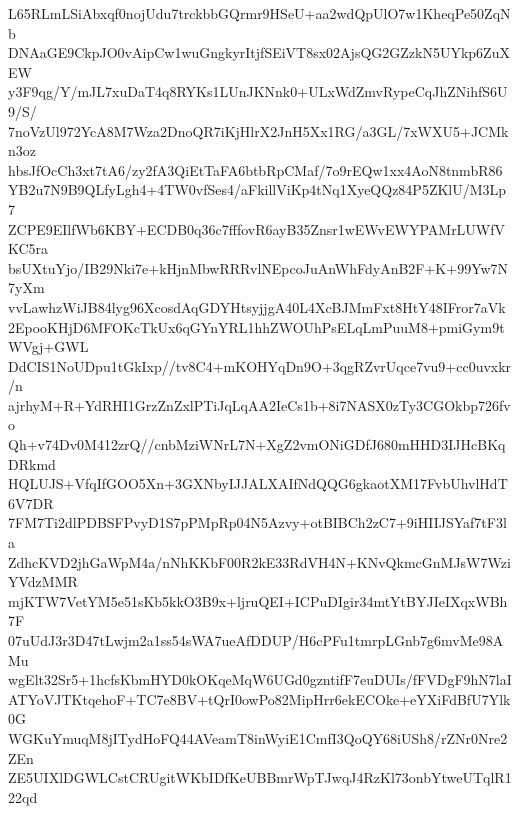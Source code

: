 L65RLmLSiAbxqf0nojUdu7trckbbGQrmr9HSeU+aa2wdQpUlO7w1KheqPe50ZqNb
DNAaGE9CkpJO0vAipCw1wuGngkyrItjfSEiVT8sx02AjsQG2GZzkN5UYkp6ZuXEW
y3F9qg/Y/mJL7xuDaT4q8RYKs1LUnJKNnk0+ULxWdZmvRypeCqJhZNihfS6U9/S/
7noVzUl972YcA8M7Wza2DnoQR7iKjHlrX2JnH5Xx1RG/a3GL/7xWXU5+JCMkn3oz
hbsJfOcCh3xt7tA6/zy2fA3QiEtTaFA6btbRpCMaf/7o9rEQw1xx4AoN8tnmbR86
YB2u7N9B9QLfyLgh4+4TW0vfSes4/aFkillViKp4tNq1XyeQQz84P5ZKlU/M3Lp7
ZCPE9EIlfWb6KBY+ECDB0q36c7fffovR6ayB35Znsr1wEWvEWYPAMrLUWfVKC5ra
bsUXtuYjo/IB29Nki7e+kHjnMbwRRRvlNEpcoJuAnWhFdyAnB2F+K+99Yw7N7yXm
vvLawhzWiJB84lyg96XcosdAqGDYHtsyjjgA40L4XcBJMmFxt8HtY48IFror7aVk
2EpooKHjD6MFOKcTkUx6qGYnYRL1hhZWOUhPsELqLmPuuM8+pmiGym9tWVgj+GWL
DdCIS1NoUDpu1tGkIxp//tv8C4+mKOHYqDn9O+3qgRZvrUqce7vu9+cc0uvxkr/n
ajrhyM+R+YdRHI1GrzZnZxlPTiJqLqAA2IeCs1b+8i7NASX0zTy3CGOkbp726fvo
Qh+v74Dv0M412zrQ//cnbMziWNrL7N+XgZ2vmONiGDfJ680mHHD3IJHcBKqDRkmd
HQLUJS+VfqIfGOO5Xn+3GXNbyIJJALXAIfNdQQG6gkaotXM17FvbUhvlHdT6V7DR
7FM7Ti2dlPDBSFPvyD1S7pPMpRp04N5Azvy+otBIBCh2zC7+9iHIIJSYaf7tF3la
ZdhcKVD2jhGaWpM4a/nNhKKbF00R2kE33RdVH4N+KNvQkmcGnMJsW7WziYVdzMMR
mjKTW7VetYM5e51sKb5kkO3B9x+ljruQEI+ICPuDIgir34mtYtBYJIeIXqxWBh7F
07uUdJ3r3D47tLwjm2a1ss54sWA7ueAfDDUP/H6cPFu1tmrpLGnb7g6mvMe98AMu
wgElt32Sr5+1hcfsKbmHYD0kOKqeMqW6UGd0gzntifF7euDUIs/fFVDgF9hN7laI
ATYoVJTKtqehoF+TC7e8BV+tQrI0owPo82MipHrr6ekECOke+eYXiFdBfU7Ylk0G
WGKuYmuqM8jITydHoFQ44AVeamT8inWyiE1CmfI3QoQY68iUSh8/rZNr0Nre2ZEn
ZE5UIXlDGWLCstCRUgitWKbIDfKeUBBmrWpTJwqJ4RzKl73onbYtweUTqlR122qd
